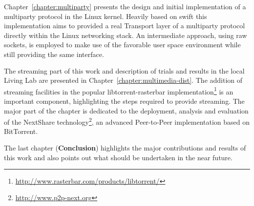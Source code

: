 Chapter~\ref{chapter:multiparty} presents the design and initial
implementation of a multiparty protocol in the Linux kernel. Heavily based on
swift this implementation aims to provided a real Transport layer of a
multiparty protocol directly within the Linux networking stack. An
intermediate approach, using raw sockets, is employed to make use of the
favorable user space environment while still providing the same interface.

The streaming part of this work and description of trials and results in the
local Living Lab are presented in Chapter~\ref{chapter:multimedia-dist}. The
addition of streaming facilities in the popular libtorrent-rasterbar
implementation\footnote{\url{http://www.rasterbar.com/products/libtorrent/}} is an important component, highlighting the
steps required to provide streaming. The major part of the chapter is
dedicated to the deployment, analysis and evaluation of the NextShare
technology\footnote{\url{http://www.p2p-next.org}}, an advanced Peer-to-Peer implementation based on
BitTorrent.

The last chapter (\textbf{Conclusion}) highlights the major contributions and
results of this work and also points out what should be undertaken in the near
future.
